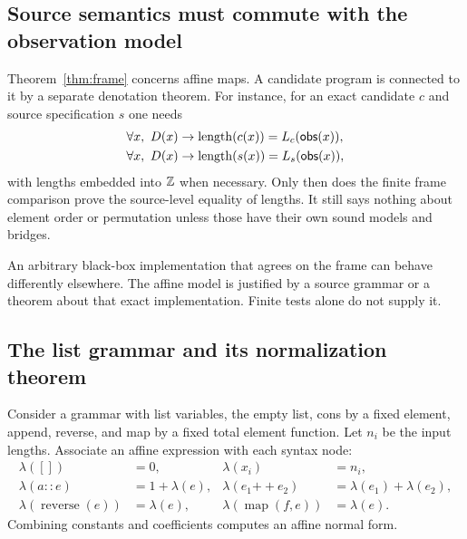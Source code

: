 \documentclass[11pt,a4paper]{article}
\theoremstyle{plain}
\theoremstyle{definition}
\theoremstyle{remark}
\begin{document}
\subsection{Source semantics must commute with the observation model}
Theorem~\ref{thm:frame} concerns affine maps. A candidate program is connected to it by a separate denotation theorem. For instance, for an exact candidate $c$ and source specification $s$ one needs
\begin{align*}
 \forall x,\ D(x)&\to \operatorname{length}(c(x))=L_c(\mathsf{obs}(x)),\\
 \forall x,\ D(x)&\to \operatorname{length}(s(x))=L_s(\mathsf{obs}(x)),
\end{align*}
with lengths embedded into $\mathbb Z$ when necessary. Only then does the finite frame comparison prove the source-level equality of lengths. It still says nothing about element order or permutation unless those have their own sound models and bridges.

An arbitrary black-box implementation that agrees on the frame can behave differently elsewhere. The affine model is justified by a source grammar or a theorem about that exact implementation. Finite tests alone do not supply it.

\subsection{The list grammar and its normalization theorem}
Consider a grammar with list variables, the empty list, cons by a fixed element, append, reverse, and map by a fixed total element function. Let $n_i$ be the input lengths. Associate an affine expression with each syntax node:
\begin{align*}
 \lambda([])&=0,&\lambda(x_i)&=n_i,\\
 \lambda(a::e)&=1+\lambda(e),&
 \lambda(e_1\mathbin{+\!+}e_2)&=\lambda(e_1)+\lambda(e_2),\\
 \lambda(\operatorname{reverse}(e))&=\lambda(e),&
 \lambda(\operatorname{map}(f,e))&=\lambda(e).
\end{align*}
Combining constants and coefficients computes an affine normal form.
\end{document}
